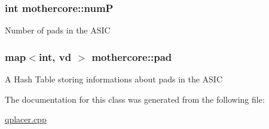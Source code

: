 \subsubsection[{numP}]{\setlength{\rightskip}{0pt plus 5cm}int mothercore\+::numP\hspace{0.3cm}{\ttfamily [private]}}\hypertarget{classmothercore_a2267ccb4d62638cb401e86b612a7b88a}{}\label{classmothercore_a2267ccb4d62638cb401e86b612a7b88a}
Number of pads in the A\+S\+IC 
\subsubsection[{pad}]{\setlength{\rightskip}{0pt plus 5cm}map$<$int, {\bf vd} $>$ mothercore\+::pad\hspace{0.3cm}{\ttfamily [private]}}\hypertarget{classmothercore_aa99289e91a4a78b1edc271498a68f88b}{}\label{classmothercore_aa99289e91a4a78b1edc271498a68f88b}
A Hash Table storing informations about pads in the A\+S\+IC 

The documentation for this class was generated from the following file\+:\begin{DoxyCompactItemize}
\item 
\hyperlink{qplacer_8cpp}{qplacer.\+cpp}\end{DoxyCompactItemize}
